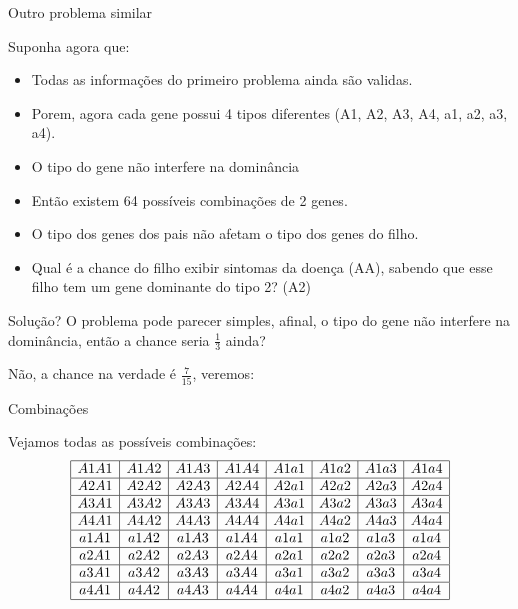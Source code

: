 \documentclass{beamer}
\begin{document}
\begin{frame}{Outro problema similar}
	\begin{block}{Suponha agora que:}
		\begin{itemize}
			\item Todas as informações do primeiro problema ainda são validas.
			\item Porem, agora cada gene possui 4 tipos diferentes (A1, A2, A3, A4, a1, a2, a3, a4).
			\item O tipo do gene não interfere na dominância
			\item Então existem 64 possíveis combinações de 2 genes.
			\item O tipo dos genes dos pais não afetam o tipo dos genes do filho.
			\item Qual é a chance do filho exibir sintomas da doença (AA), sabendo que esse filho tem um gene dominante do tipo 2? (A2)
		\end{itemize}
	\end{block}
\end{frame}

\begin{frame}{Solução?}
	O problema pode parecer simples, afinal, o tipo do gene não interfere na dominância, então a chance seria $\frac{1}{3}$ ainda?
	
	Não, a chance na verdade é $\frac{7}{15}$, veremos:
\end{frame}

\begin{frame}{Combinações}
	\begin{block}{Vejamos todas as possíveis combinações:}
		\[  \begin{array}{|c|c|c|c|c|c|c|c|}
			\hline
			A1A1 & A1A2 & A1A3 & A1A4 & A1a1 & A1a2 & A1a3 & A1a4\\ 
			\hline
			A2A1 & A2A2 & A2A3 & A2A4 & A2a1 & A2a2 & A2a3 & A2a4\\ 
			\hline
			A3A1 & A3A2 & A3A3 & A3A4 & A3a1 & A3a2 & A3a3 & A3a4\\ 
			\hline
			A4A1 & A4A2 & A4A3 & A4A4 & A4a1 & A4a2 & A4a3 & A4a4\\ 
			\hline
			a1A1 & a1A2 & a1A3 & a1A4 & a1a1 & a1a2 & a1a3 & a1a4\\ 
			\hline
			a2A1 & a2A2 & a2A3 & a2A4 & a2a1 & a2a2 & a2a3 & a2a4\\ 
			\hline
			a3A1 & a3A2 & a3A3 & a3A4 & a3a1 & a3a2 & a3a3 & a3a4\\ 
			\hline
			a4A1 & a4A2 & a4A3 & a4A4 & a4a1 & a4a2 & a4a3 & a4a4\\ 
			\hline
		\end{array}\]
	\end{block}
\end{frame}
\end{document}

